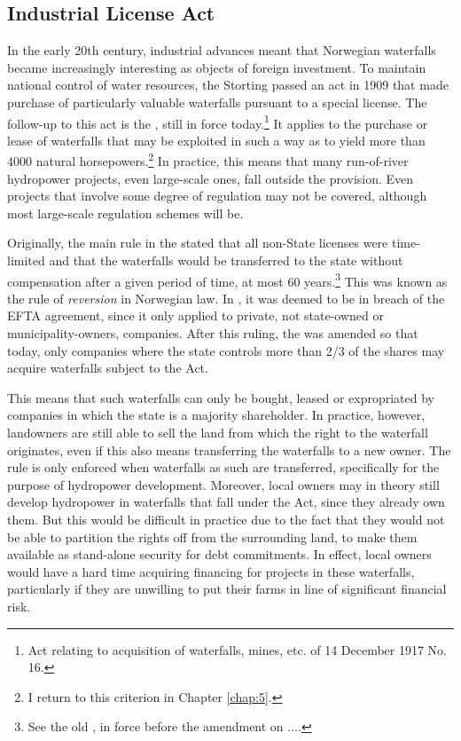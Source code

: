\subsection{Industrial License Act}\label{sec:ica17}

In the early 20th century, industrial advances meant that Norwegian waterfalls became increasingly interesting as objects of foreign investment. To maintain national control of water resources, the Storting passed an act in 1909 that made purchase of particularly valuable waterfalls pursuant to a special license. The follow-up to this act is the \cite{ica17}, still in force today.\footnote{Act relating to acquisition of waterfalls, mines, etc. of 14 December 1917 No. 16.} It applies to the purchase or lease of waterfalls that may be exploited in such a way as to yield more than 4000 natural horsepowers.\footnote{I return to this criterion in Chapter \ref{chap:5}.} In practice, this means that many run-of-river hydropower projects, even large-scale ones, fall outside the provision. Even projects that involve some degree of regulation may not be covered, although most large-scale regulation schemes will be.

Originally, the main rule in the \cite{ica17} stated that all non-State licenses were time-limited and that the waterfalls would be transferred to the state without compensation after a given period of time, at most 60 years.\footnote{See the old \cite[2]{ica17}, in force before the amendment on ....} This was known as the rule of {\it reversion} in Norwegian law. In \cite{efta07}, it was deemed to be in breach of the EFTA agreement, since it only applied to private, not state-owned or municipality-owners, companies.  After this ruling, the \cite{ica17} was amended so that today, only companies where the state controls more than 2/3 of the shares may acquire waterfalls subject to the Act.

This means that such waterfalls can only be bought, leased or expropriated by companies in which the state is a majority shareholder. In practice, however, landowners are still able to sell the land from which the right to the waterfall originates, even if this also means transferring the waterfalls to a new owner. The rule is only enforced when waterfalls as such are transferred, specifically for the purpose of hydropower development. Moreover, local owners may in theory still develop hydropower in waterfalls that fall under the Act, since they already own them. But this would be difficult in practice due to the fact that they would not be able to partition the rights off from the surrounding land, to make them available as stand-alone security for debt commitments. In effect, local owners would have a hard time acquiring financing for projects in these waterfalls, particularly if they are unwilling to put their farms in line of significant financial risk.

